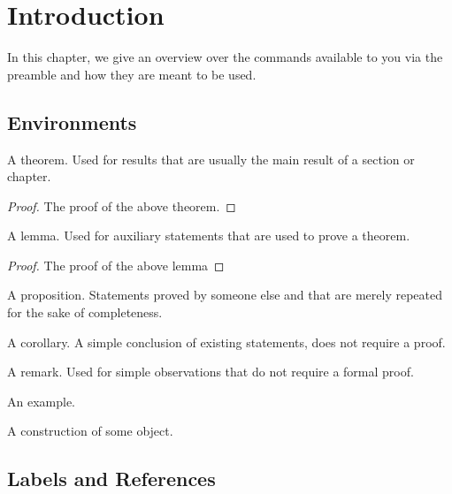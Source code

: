 \chapter{Introduction}

In this chapter, we give an overview over the commands available to you via the preamble and how they are meant to be used.


\section{Environments}

\begin{theorem}
A theorem. Used for results that are usually the main result of a section or chapter.
\end{theorem}

\begin{proof}
The proof of the above theorem.	
\end{proof}


\begin{lemma}
A lemma. Used for auxiliary statements that are used to prove a theorem.
\end{lemma}

\begin{proof}
The proof of the above lemma	
\end{proof}


\begin{proposition}
A proposition. Statements proved by someone else and that are merely repeated for the sake of completeness.
\end{proposition}

\begin{corollary}
A corollary. A simple conclusion of existing statements, does not require a proof.
\end{corollary}

\begin{remark}
A remark. Used for simple observations that do not require a formal proof.	
\end{remark}

\begin{example}
An example.	
\end{example}

\begin{construction}
A construction of some object.
\end{construction}

\section{Labels and References}

